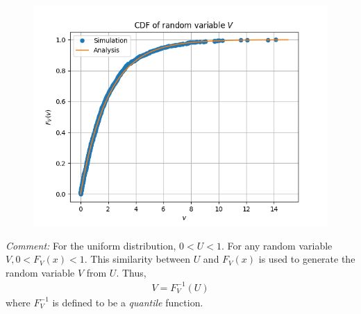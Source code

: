 \begin{figure}[!ht]
\centering
\includegraphics[width=\columnwidth]{figs/quantile/quantile.png}
\caption{}
\label{fig:probman_V_cdf_analsim}
\end{figure}
{\em Comment:}
For the uniform distribution, $0 < U < 1$.  For any random variable $V, 0 < F_V(x) < 1$.  This
similarity between $U$ and $F_V(x)$ is used to generate the random variable $V$ from $U$.
Thus,
\begin{align}
V = F_V^{-1}(U)
\end{align}
%
where $F_V^{-1}$ is defined to be a {\em quantile} function.
